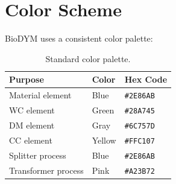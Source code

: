 \section{Color Scheme}

BioDYM uses a consistent color palette:

\begin{table}[h]
\centering
\begin{tabular}{lll}
\toprule
\textbf{Purpose} & \textbf{Color} & \textbf{Hex Code} \\
\midrule
Material element & Blue & \texttt{\#2E86AB} \\
WC element & Green & \texttt{\#28A745} \\
DM element & Gray & \texttt{\#6C757D} \\
CC element & Yellow & \texttt{\#FFC107} \\
Splitter process & Blue & \texttt{\#2E86AB} \\
Transformer process & Pink & \texttt{\#A23B72} \\
\bottomrule
\end{tabular}
\caption{Standard color palette.}
\end{table}
